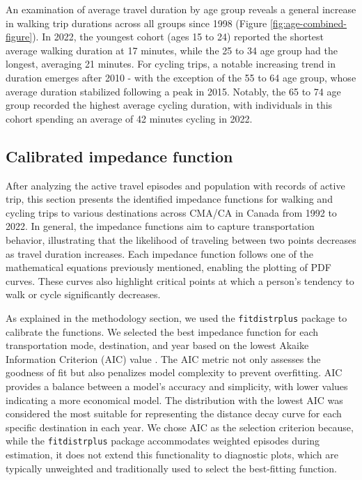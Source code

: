 \documentclass[preprint, 3p,
authoryear]{elsarticle} %
\begin{document}
An examination of average travel duration by age group reveals a general
increase in walking trip durations across all groups since 1998 (Figure
\ref{fig:age-combined-figure}). In 2022, the youngest cohort (ages 15 to
24) reported the shortest average walking duration at 17 minutes, while
the 25 to 34 age group had the longest, averaging 21 minutes. For
cycling trips, a notable increasing trend in duration emerges after 2010
- with the exception of the 55 to 64 age group, whose average duration
stabilized following a peak in 2015. Notably, the 65 to 74 age group
recorded the highest average cycling duration, with individuals in this
cohort spending an average of 42 minutes cycling in 2022.

\subsection{Calibrated impedance
function}\label{calibrated-impedance-function}

After analyzing the active travel episodes and population with records
of active trip, this section presents the identified impedance functions
for walking and cycling trips to various destinations across CMA/CA in
Canada from 1992 to 2022. In general, the impedance functions aim to
capture transportation behavior, illustrating that the likelihood of
traveling between two points decreases as travel duration increases.
Each impedance function follows one of the mathematical equations
previously mentioned, enabling the plotting of PDF curves. These curves
also highlight critical points at which a person's tendency to walk or
cycle significantly decreases.

As explained in the methodology section, we used the
\texttt{fitdistrplus} package \citep{delignette2015fitdistrplus} to
calibrate the functions. We selected the best impedance function for
each transportation mode, destination, and year based on the lowest
Akaike Information Criterion (AIC) value \citep{akaike1974}. The AIC
metric not only assesses the goodness of fit but also penalizes model
complexity to prevent overfitting. AIC provides a balance between a
model's accuracy and simplicity, with lower values indicating a more
economical model. The distribution with the lowest AIC was considered
the most suitable for representing the distance decay curve for each
specific destination in each year. We chose AIC as the selection
criterion because, while the \texttt{fitdistrplus} package accommodates
weighted episodes during estimation, it does not extend this
functionality to diagnostic plots, which are typically unweighted and
traditionally used to select the best-fitting function.
\end{document}
